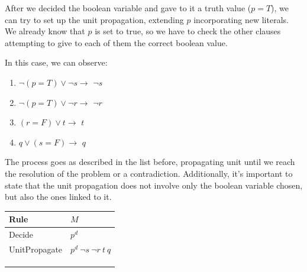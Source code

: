 \begin{example}
    After we decided the boolean variable and gave to it a truth value ($p = T$), we can try to set up the unit propagation, extending $p$ incorporating 
    new literals. We already know that $p$ is set to true, so we have to check the other clauses attempting to give to each of them the correct boolean value. \vspace{7pt}

    In this case, we can observe:
    \begin{enumerate}
        \item $\neg (p = T) \vee \neg s \rightarrow$ $\neg s$
        \item[4.] $\neg (p = T) \vee \neg r \rightarrow$ $\neg r$
        \item[8.] $(r = F) \vee t \rightarrow$ $t$
        \item[6.] $q \vee (s = F) \rightarrow$ $q$
    \end{enumerate} \vspace{3.5pt}
    The process goes as described in the list before, propagating unit until we reach the resolution of the problem or a contradiction. Additionally, it's important to state that 
    the unit propagation does not involve only the boolean variable chosen, but also the ones linked to it. \vspace{7pt}
    \begin{center}
        \begin{tabular}{|p{2.75cm}|p{5cm}|}          
            \hline
                \textbf{Rule} & $M$\\ 
            \hline
                Decide & $p^d$ \\
            \hline
                UnitPropagate & $p^d\  \neg s \ \neg r \ t \ q$ \\
            \hline
                & \\
            \hline
                & \\
            \hline
                & \\
            \hline
        \end{tabular}
    \end{center} \vspace{7pt}


\end{example}
